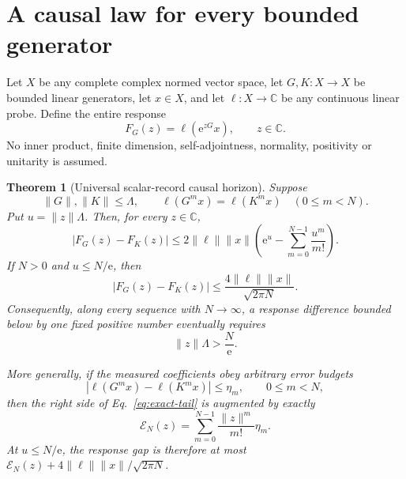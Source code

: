 \documentclass[10pt]{article}
\numberwithin{equation}{section}
\newtheorem{theorem}{Theorem}[section]
\theoremstyle{definition}
\theoremstyle{remark}
\newcommand{\C}{\mathbb C}
\newcommand{\ee}{\mathrm e}
\newcommand{\norm}[1]{\lVert #1\rVert}
\begin{document}
\section{A causal law for every bounded generator}

Let \(X\) be any complete complex normed vector space, let
\(G,K:X\to X\) be bounded linear generators, let \(x\in X\), and let
\(\ell:X\to\C\) be any continuous linear probe.  Define the entire response
\begin{equation}
 F_G(z)=\ell(\ee^{zG}x),\qquad z\in\C .
\label{eq:response}
\end{equation}
No inner product, finite dimension, self-adjointness, normality, positivity
or unitarity is assumed.

\begin{theorem}[Universal scalar-record causal horizon]
\label{thm:universal}
Suppose
\[
 \norm{G},\norm{K}\le\Lambda,\qquad
 \ell(G^m x)=\ell(K^m x)\quad(0\le m<N).
\]
Put \(u=\norm{z}\Lambda\).  Then, for every \(z\in\C\),
\begin{equation}
 |F_G(z)-F_K(z)|
 \le
 2\norm{\ell}\norm{x}
 \left(\ee^u-\sum_{m=0}^{N-1}\frac{u^m}{m!}\right).
\label{eq:exact-tail}
\end{equation}
If \(N>0\) and \(u\le N/\ee\), then
\begin{equation}
 |F_G(z)-F_K(z)|
 \le
 \frac{4\norm{\ell}\norm{x}}{\sqrt{2\pi N}}.
\label{eq:critical}
\end{equation}
Consequently, along every sequence with \(N\to\infty\), a response
difference bounded below by one fixed positive number eventually requires
\begin{equation}
 \norm{z}\Lambda>\frac{N}{\ee}.
\label{eq:universal-critical}
\end{equation}

More generally, if the measured coefficients obey arbitrary error budgets
\[
 |\ell(G^m x)-\ell(K^m x)|\le\eta_m,\qquad 0\le m<N,
\]
then the right side of Eq.~\eqref{eq:exact-tail} is augmented by exactly
\begin{equation}
 \mathcal E_N(z)=
 \sum_{m=0}^{N-1}\frac{\norm{z}^m}{m!}\eta_m.
\label{eq:calibration}
\end{equation}
At \(u\le N/\ee\), the response gap is therefore at most
\(\mathcal E_N(z)+4\norm{\ell}\norm{x}/\sqrt{2\pi N}\).
\end{theorem}
\end{document}
